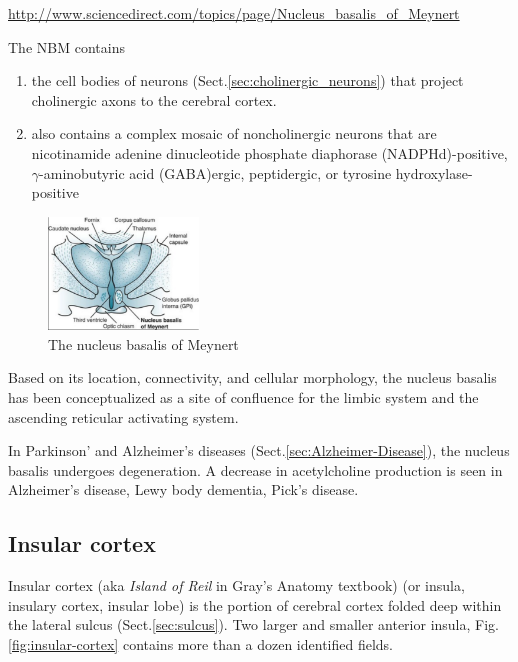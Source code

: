 \url{http://www.sciencedirect.com/topics/page/Nucleus_basalis_of_Meynert}


The NBM contains 
\begin{enumerate}
  \item the cell bodies of neurons (Sect.\ref{sec:cholinergic_neurons})
that project cholinergic axons to the cerebral cortex.

  \item  also contains a complex mosaic of noncholinergic
  neurons that are nicotinamide adenine dinucleotide phosphate diaphorase
  (NADPHd)-positive, $\gamma$-aminobutyric acid (GABA)ergic, peptidergic, or
  tyrosine hydroxylase-positive
\end{enumerate}

\begin{figure}[hbt]
  \centerline{\includegraphics[height=3cm,
    angle=0]{./images/nucleus-basalis-Meynert.eps}}
  \caption{The nucleus basalis of Meynert}
  \label{fig:nucleus-basalis-Meynert}
\end{figure}


Based on its location, connectivity, and cellular morphology, the nucleus
basalis has been conceptualized as a site of confluence for the limbic system
and the ascending reticular activating system.

In Parkinson' and Alzheimer's diseases (Sect.\ref{sec:Alzheimer-Disease}), the
nucleus basalis undergoes degeneration. A decrease in acetylcholine production
is seen in Alzheimer's disease, Lewy body dementia, Pick's disease.



\subsection{Insular cortex}
\label{sec:insular-cortex}

Insular cortex (aka {\it Island of Reil} in Gray's Anatomy textbook) (or
insula, insulary cortex, insular lobe) is the portion of cerebral cortex folded
deep within the lateral sulcus (Sect.\ref{sec:sulcus}). Two larger and smaller
anterior insula, Fig.\ref{fig:insular-cortex} contains more than a dozen
identified fields.

